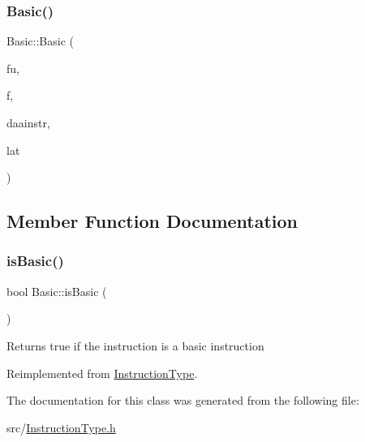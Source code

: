 \mbox{\label{classBasic_a680cf8b7bf4d6707d1a63c24cc13bce6}} 
\subsubsection{\texorpdfstring{Basic()}{Basic()}\hspace{0.1cm}{\footnotesize\ttfamily [2/2]}}
{\footnotesize\ttfamily Basic\+::\+Basic (\begin{DoxyParamCaption}\item[{const string \&}]{fu,  }\item[{const set$<$ \hyperlink{classInstructionFormat}{Instruction\+Format} $\ast$$>$ \&}]{f,  }\item[{\hyperlink{classDAAInstruction}{D\+A\+A\+Instruction} $\ast$}]{daainstr,  }\item[{int}]{lat }\end{DoxyParamCaption})}



\subsection{Member Function Documentation}
\mbox{\label{classBasic_a3ab68a71a2c405d7e14a11a8ce24fd07}} 
\subsubsection{\texorpdfstring{is\+Basic()}{isBasic()}}
{\footnotesize\ttfamily bool Basic\+::is\+Basic (\begin{DoxyParamCaption}{ }\end{DoxyParamCaption})\hspace{0.3cm}{\ttfamily [virtual]}}

Returns true if the instruction is a basic instruction 

Reimplemented from \hyperlink{classInstructionType_ada75c9091ab7e6b4b9a7df984288d1f8}{Instruction\+Type}.



The documentation for this class was generated from the following file\+:\begin{DoxyCompactItemize}
\item 
src/\hyperlink{InstructionType_8h}{Instruction\+Type.\+h}\end{DoxyCompactItemize}
